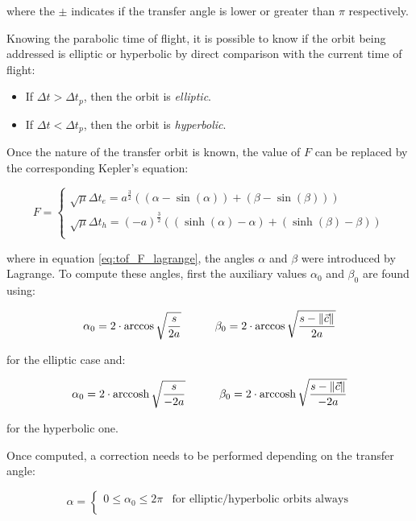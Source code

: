 where the $\pm$ indicates if the transfer angle is lower or greater than $\pi$
respectively.

Knowing the parabolic time of flight, it is possible to know if the orbit being
addressed is elliptic or hyperbolic by direct comparison with the current time
of flight:

\begin{itemize}
  \item If $\Delta t > \Delta t_p$, then the orbit is \textit{elliptic}.
  \item If $\Delta t < \Delta t_p$, then the orbit is \textit{hyperbolic}.
\end{itemize}

Once the nature of the transfer orbit is known, the value of $F$ can be
replaced by the corresponding Kepler's equation:

\begin{equation}
  F = 
  \begin{cases}
  \sqrt{\mu} \Delta t_e = a^{\frac{3}{2}}\left((\alpha - \sin{(\alpha)}) + (\beta - \sin{(\beta)}) \right) \\
  \sqrt{\mu} \Delta t_h = (-a)^{\frac{3}{2}}\left((\sinh{(\alpha)} - \alpha) + (\sinh{(\beta)} - \beta) \right) \\
  \end{cases}
  \label{eq:tof_F_lagrange}
\end{equation}

where in equation \ref{eq:tof_F_lagrange}, the angles $\alpha$ and $\beta$ were
introduced by Lagrange. To compute these angles, first the auxiliary values
$\alpha_0$ and $\beta_0$ are found using:

\begin{equation}
  \alpha_0 = 2 \cdot \arccos{\sqrt{\frac{s}{2a}}}\quad\quad\quad
  \beta_0 = 2 \cdot \arccos{\sqrt{\frac{s - \lVert\vec{c}\rVert}{2a}}}
\end{equation}

for the elliptic case and:

\begin{equation}
  \alpha_0 = 2 \cdot \operatorname{arccosh}{\sqrt{\frac{s}{-2a}}}\quad\quad\quad
  \beta_0 = 2 \cdot \operatorname{arccosh}{\sqrt{\frac{s - \lVert\vec{c}\rVert}{-2a}}}
\end{equation}

for the hyperbolic one.

Once computed, a correction needs to be performed depending on the transfer
angle:

\begin{equation}
  \alpha =
  \begin{cases}
	  0 \leqslant \alpha_0 \leqslant 2\pi & \text{for elliptic/hyperbolic orbits always} \\
  \end{cases}
\end{equation}

